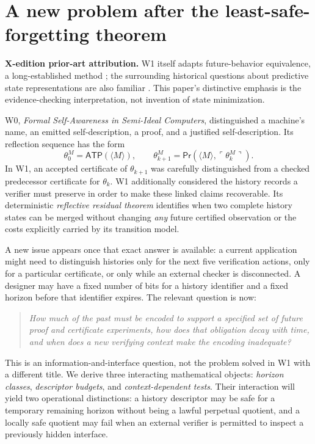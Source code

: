\documentclass[11pt,letterpaper]{article}
\newcommand{\PriorArtNote}[1]{%
\par\smallskip\noindent\begin{minipage}{\linewidth}\small\color{black!85}%
\textbf{X-edition prior-art attribution.} #1\end{minipage}\par\smallskip}
\newcommand{\ATP}{\mathsf{ATP}}
\newcommand{\Prv}{\mathsf{Pr}}
\begin{document}
\section{A new problem after the least-safe-forgetting theorem}
\PriorArtNote{W1 itself adapts future-behavior equivalence, a long-established method \cite{nerode,milner}; the surrounding historical questions about predictive state representations are also familiar \cite{shalizi}. This paper's distinctive emphasis is the evidence-checking interpretation, not invention of state minimization.}
W0, \emph{Formal Self-Awareness in Semi-Ideal Computers}, distinguished a machine's name, an emitted self-description, a proof, and a justified self-description. Its reflection sequence has the form
\begin{equation}\label{eq:theta}
\theta_0^M=\ATP(\langle M\rangle),\qquad
\theta_{k+1}^M=\Prv(\langle M\rangle,\ulcorner\theta_k^M\urcorner).
\end{equation}
In W1, an accepted certificate of $\theta_{k+1}$ was carefully distinguished from a checked predecessor certificate for $\theta_k$. W1 additionally considered the history records a verifier must preserve in order to make these linked claims recoverable. Its deterministic \emph{reflective residual theorem} identifies when two complete history states can be merged without changing \emph{any} future certified observation or the costs explicitly carried by its transition model.

A new issue appears once that exact answer is available: a current application might need to distinguish histories only for the next five verification actions, only for a particular certificate, or only while an external checker is disconnected. A designer may have a fixed number of bits for a history identifier and a fixed horizon before that identifier expires. The relevant question is now:
\begin{quote}
\emph{How much of the past must be encoded to support a specified set of future proof and certificate experiments, how does that obligation decay with time, and when does a new verifying context make the encoding inadequate?}
\end{quote}
This is an information-and-interface question, not the problem solved in W1 with a different title. We derive three interacting mathematical objects: \emph{horizon classes}, \emph{descriptor budgets}, and \emph{context-dependent tests}. Their interaction will yield two operational distinctions: a history descriptor may be safe for a temporary remaining horizon without being a lawful perpetual quotient, and a locally safe quotient may fail when an external verifier is permitted to inspect a previously hidden interface.
\end{document}
